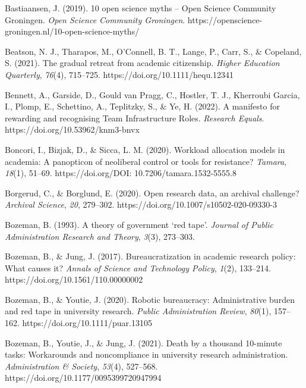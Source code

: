 \documentclass[meta, authordate]{jote-new-article}
\begin{document}
Bastiaansen, J. (2019). 10 open science myths – Open Science Community Groningen. \emph{Open Science Community Groningen}. https://openscience-groningen.nl/10-open-science-myths/



Beatson, N. J., Tharapos, M., O’Connell, B. T., Lange, P., Carr, S., & Copeland, S. (2021). The gradual retreat from academic citizenship. \emph{Higher Education Quarterly}, \emph{76}(4), 715–725. https://doi.org/10.1111/hequ.12341



Bennett, A., Garside, D., Gould van Pragg, C., Hostler, T. J., Kherroubi Garcia, I., Plomp, E., Schettino, A., Teplitzky, S., & Ye, H. (2022). A manifesto for rewarding and recognising Team Infrastructure Roles. \emph{Research Equals}. https://doi.org/10.53962/knm3-bnvx



Boncori, I., Bizjak, D., & Sicca, L. M. (2020). Workload allocation models in academia: A panopticon of neoliberal control or tools for resistance? \emph{Tamara}, \emph{18}(1), 51–69. https://doi.org/DOI: 10.7206/tamara.1532-5555.8



Borgerud, C., & Borglund, E. (2020). Open research data, an archival challenge? \emph{Archival Science}, \emph{20}, 279–302. https://doi.org/10.1007/s10502-020-09330-3



Bozeman, B. (1993). A theory of government ‘red tape’. \emph{Journal of Public Administration Research and Theory}, \emph{3}(3), 273–303.



Bozeman, B., & Jung, J. (2017). Bureaucratization in academic research policy: What causes it? \emph{Annals of Science and Technology Policy}, \emph{1}(2), 133–214. https://doi.org/10.1561/110.00000002



Bozeman, B., & Youtie, J. (2020). Robotic bureaucracy: Administrative burden and red tape in university research. \emph{Public Administration Review}, \emph{80}(1), 157–162. https://doi.org/10.1111/puar.13105



Bozeman, B., Youtie, J., & Jung, J. (2021). Death by a thousand 10-minute tasks: Workarounds and noncompliance in university research administration. \emph{Administration & Society}, \emph{53}(4), 527–568. https://doi.org/10.1177/0095399720947994
\end{document}
